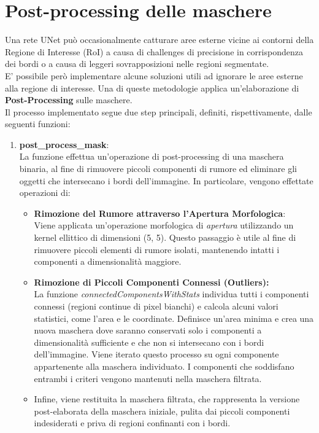 \documentclass[12pt,a4paper,openright,twoside]{book}
\begin{document}
\section{Post-processing delle maschere} 
Una rete UNet può occasionalmente catturare aree esterne vicine ai contorni della Regione di Interesse (RoI) a causa di challenges di precisione in corrispondenza dei bordi o a causa di leggeri sovrapposizioni nelle regioni segmentate.\\
E' possibile però implementare alcune soluzioni utili ad ignorare le aree esterne alla regione di interesse. Una di queste metodologie applica un'elaborazione di \textbf{Post-Processing} sulle maschere.\\
Il processo implementato segue due step principali, definiti, rispettivamente, dalle seguenti funzioni:
\begin{enumerate}
\item \textbf{post\_process\_mask}:\\
La funzione effettua un'operazione di post-processing di una maschera binaria, al fine di rimuovere piccoli componenti di rumore ed eliminare gli oggetti che intersecano i bordi dell'immagine. In particolare, vengono effettate operazioni di:
\begin{itemize}
\item \textbf{Rimozione del Rumore attraverso l’Apertura Morfologica}:\\
Viene applicata un'operazione morfologica di {\itshape apertura} utilizzando un kernel ellittico di dimensioni (5, 5). Questo passaggio è utile al fine di rimuovere piccoli elementi di rumore isolati, mantenendo intatti i componenti a dimensionalità maggiore.
\item \textbf{Rimozione di Piccoli Componenti Connessi (Outliers):}\\
La funzione {\itshape connectedComponentsWithStats} individua tutti i componenti connessi (regioni continue di pixel bianchi) e calcola alcuni valori statistici, come l'area e le coordinate. Definisce un'area minima e crea una nuova maschera dove saranno conservati solo i componenti a dimensionalità sufficiente e che non si intersecano con i bordi dell'immagine. Viene iterato questo processo su ogni componente appartenente alla maschera individuato. I componenti che soddisfano entrambi i criteri vengono mantenuti nella maschera filtrata.
\item Infine, viene restituita la maschera filtrata, che rappresenta la versione post-elaborata della maschera iniziale, pulita dai piccoli componenti indesiderati e priva di regioni confinanti con i bordi.
\end{itemize}
\begin{figure}[H]
    \centering
    
\end{figure}


\end{enumerate}
\end{document}
